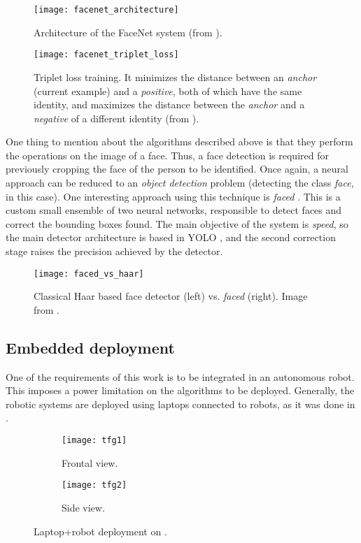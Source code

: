 \begin{figure}[h]
	\centering
	\texttt{[image: facenet\_architecture]}
	\caption{Architecture of the FaceNet system (from \cite{facenet}).}
	\label{fig:1_facenet_architecture}
\end{figure}



\begin{figure}[h]
	\centering
	\texttt{[image: facenet\_triplet\_loss]}
	\caption{Triplet loss training. It minimizes the distance between an \emph{anchor} (current example) and a \emph{positive}, both of which have the same identity, and maximizes the distance between the \emph{anchor} and a \emph{negative} of a different identity (from \cite{facenet}).}
	\label{fig:1_facenet_triplet_loss}
\end{figure}


One thing to mention about the algorithms described above is that they perform the operations on the image of a face. Thus, a face detection is required for previously cropping the face of the person to be identified. Once again, a neural approach can be reduced to an \textit{object detection} problem (detecting the class \textit{face}, in this case). One interesting approach using this technique is \textit{faced} \cite{faced}. This is a custom small ensemble of two neural networks, responsible to detect faces and correct the bounding boxes found. The main objective of the system is \textit{speed}, so the main detector architecture is based in YOLO \cite{yolov1}, and the second correction stage raises the precision achieved by the detector.

\begin{figure}[h]
	\centering
	\texttt{[image: faced\_vs\_haar]}
	\caption{Classical Haar based face detector \cite{violajones} (left) vs. \textit{faced} (right). Image from \cite{faced}.}
	\label{fig:1_faced_vs_haar}
\end{figure}


\subsection{Embedded deployment}
One of the requirements of this work is to be integrated in an autonomous robot. This imposes a power limitation on the algorithms to be deployed. Generally, the robotic systems are deployed using laptops connected to robots, as it was done in \cite{tfg}.

\begin{figure}[h]
	\centering
	\begin{subfigure}[h]{0.4\linewidth}
		\texttt{[image: tfg1]}
		\caption{Frontal view.}
		\label{fig:1_turtlebot_front}
	\end{subfigure}
	\begin{subfigure}[h]{0.4\linewidth}
		\texttt{[image: tfg2]}
		\caption{Side view.}
		\label{fig:1_turtlebot_side}
	\end{subfigure}
	\caption{Laptop+robot deployment on \cite{tfg}.}
	\label{fig:1_real_tfg}
\end{figure}

